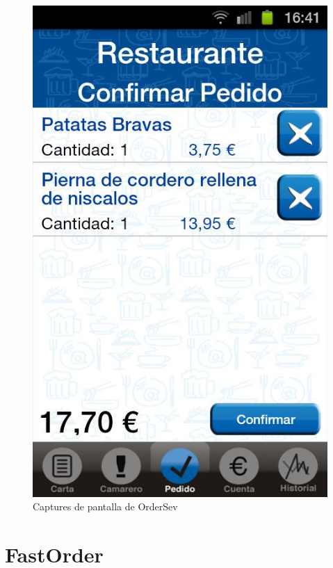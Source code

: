 \begin{figure}[H]
\includegraphics[scale=0.20]{Figures/cloudwaiter-3.jpg}
\caption{Captures de pantalla de OrderSev}
\end{figure}


\section{FastOrder}

